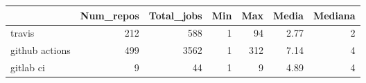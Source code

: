 \begin{tabular}{lrrrrrr}
\toprule
{} &  Num\_repos &  Total\_jobs &  Min &  Max &  Media &  Mediana \\
\midrule
travis         &        212 &         588 &    1 &   94 &   2.77 &        2 \\
github actions &        499 &        3562 &    1 &  312 &   7.14 &        4 \\
gitlab ci      &          9 &          44 &    1 &    9 &   4.89 &        4 \\
\bottomrule
\end{tabular}
